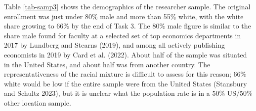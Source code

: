 \documentclass[
  letterpaper,
  DIV=11,
  numbers=noendperiod]{scrartcl}
\begin{document}
Table \ref{tab-samp3} shows the demographics of the researcher sample.
The original enrollment was just under 80\% male and more than 55\%
white, with the white share growing to 66\% by the end of Task 3. The
80\% male figure is similar to the share male found for faculty at a
selected set of top economics departments in 2017 by Lundberg and
Stearns (2019), and among all actively publishing economists in 2019 by
Card et al. (2022). About half of the sample was situated in the United
States, and about half was from another country. The representativeness
of the racial mixture is difficult to assess for this reason; 66\% white
would be low if the entire sample were from the United States (Stansbury
and Schultz 2023), but it is unclear what the population rate is in a
50\% US/50\% other location sample.

\begin{table}[!htbp] \centering \renewcommand*{\arraystretch}{1.1}\caption{Researcher Demographics}\label{tab-samp3}
\end{table}
\end{document}

